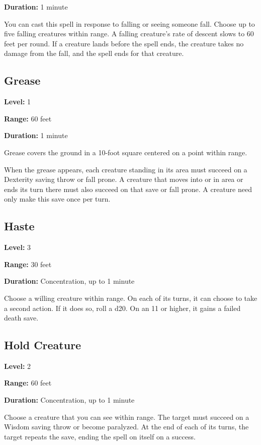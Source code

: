 \documentclass[12pt,letterpaper,twocolumn,openany,nodeprecatedcode,bg=none]{dndbook}
\let\oldsubsection\subsection
\renewcommand{\subsection}[1]{%
  \needspace{5\baselineskip}%
  \oldsubsection{#1}%
}
\begin{document}
\textbf{Duration:} 1 minute

You can cast this spell in response to falling or seeing someone fall.
Choose up to five falling creatures within range. A falling creature's
rate of descent slows to 60 feet per round. If a creature lands before
the spell ends, the creature takes no damage from the fall, and the
spell ends for that creature.

\subsection{Grease}\label{grease}

\textbf{Level:} 1

\textbf{Range:} 60 feet

\textbf{Duration:} 1 minute

Grease covers the ground in a 10-foot square centered on a point within
range.

When the grease appears, each creature standing in its area must succeed
on a Dexterity saving throw or fall prone. A creature that moves into or
in area or ends its turn there must also succeed on that save or fall
prone. A creature need only make this save once per turn.

\subsection{Haste}\label{haste}

\textbf{Level:} 3

\textbf{Range:} 30 feet

\textbf{Duration:} Concentration, up to 1 minute

Choose a willing creature within range. On each of its turns, it can
choose to take a second action. If it does so, roll a d20. On an 11 or
higher, it gains a failed death save.

\subsection{Hold Creature}\label{hold-creature}

\textbf{Level:} 2

\textbf{Range:} 60 feet

\textbf{Duration:} Concentration, up to 1 minute

Choose a creature that you can see within range. The target must succeed
on a Wisdom saving throw or become paralyzed. At the end of each of its
turns, the target repeats the save, ending the spell on itself on a
success.
\end{document}
